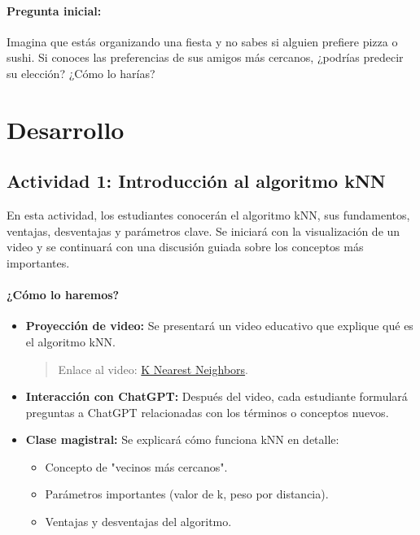 \documentclass[a4,11pt]{aleph-notas}
\begin{document}
\paragraph{Pregunta inicial:} 
Imagina que estás organizando una fiesta y no sabes si alguien prefiere pizza o sushi. Si conoces las preferencias de sus amigos más cercanos, ¿podrías predecir su elección? ¿Cómo lo harías?

\section*{Desarrollo}

\subsection*{Actividad 1: Introducción al algoritmo kNN}

En esta actividad, los estudiantes conocerán el algoritmo kNN, sus fundamentos, ventajas, desventajas y parámetros clave. Se iniciará con la visualización de un video y se continuará con una discusión guiada sobre los conceptos más importantes.

\paragraph{¿Cómo lo haremos?}  
\begin{itemize}[leftmargin=*]
    \item \textbf{Proyección de video:}  
    Se presentará un video educativo que explique qué es el algoritmo kNN.
    \begin{quote}
        Enlace al video: \href{https://www.youtube.com/watch?v=0p0o5cmgLdE}{K Nearest Neighbors}.
    \end{quote}
    \item \textbf{Interacción con ChatGPT:}  
    Después del video, cada estudiante formulará preguntas a ChatGPT relacionadas con los términos o conceptos nuevos.
    \item \textbf{Clase magistral:} Se explicará cómo funciona kNN en detalle: 
        \begin{itemize}
            \item Concepto de "vecinos más cercanos".
            \item Parámetros importantes (valor de k, peso por distancia).
            \item Ventajas y desventajas del algoritmo.
        \end{itemize}
\end{itemize}
\end{document}
